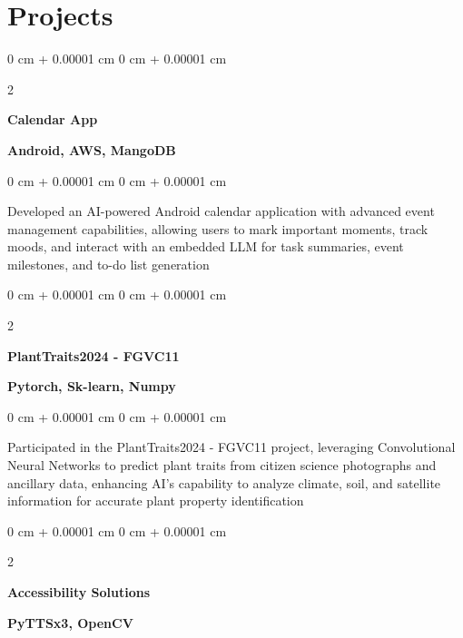 \documentclass[10pt, letterpaper]{article}
\newenvironment{highlights}{
    \begin{itemize}[
        topsep=0.10 cm,
        parsep=0.10 cm,
        partopsep=0pt,
        itemsep=0pt,
        leftmargin=0 cm + 10pt
    ]
}{
    \end{itemize}
} %
\newenvironment{onecolentry}{
    \begin{adjustwidth}{
        0 cm + 0.00001 cm
    }{
        0 cm + 0.00001 cm
    }
}{
    \end{adjustwidth}
} %
\newenvironment{twocolentry}[2][]{
    \onecolentry
    \def\secondColumn{#2}
    \setcolumnwidth{\fill, 4.5 cm}
    \begin{paracol}{2}
}{
    \switchcolumn \raggedleft \secondColumn
    \end{paracol}
    \endonecolentry
} %
\begin{document}
    
    \section{Projects}



        
        \begin{twocolentry} {
        \textbf{Android, AWS, MangoDB}
        }
            \textbf{Calendar App}
        \end{twocolentry}

        \vspace{0.10 cm}
        \begin{onecolentry}
            \begin{highlights}
                 Developed an AI-powered Android calendar application with advanced event management capabilities, allowing users to mark important moments, track moods, and interact with an embedded LLM for task summaries, event milestones, and to-do list generation

            \end{highlights}
        \end{onecolentry}


        \vspace{0.2 cm}

        \begin{twocolentry} {
        \textbf{Pytorch, Sk-learn, Numpy}
        }
            \textbf{PlantTraits2024 - FGVC11}
        \end{twocolentry}

        \vspace{0.10 cm}
        \begin{onecolentry}
            \begin{highlights}
                Participated in the PlantTraits2024 - FGVC11 project, leveraging Convolutional Neural Networks to predict plant traits from citizen science photographs and ancillary data, enhancing AI's capability to analyze climate, soil, and satellite information for accurate plant property identification
            \end{highlights}
        \end{onecolentry}


        \vspace{0.2 cm}

        \begin{twocolentry} {
            \textbf{PyTTSx3, OpenCV}
        }
            \textbf{Accessibility Solutions}
        \end{twocolentry}
\end{document}
